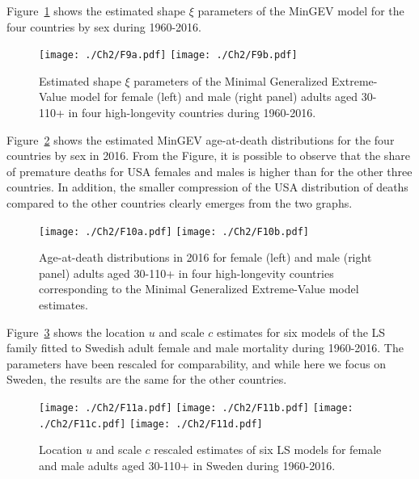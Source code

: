 \documentclass[Thesis]{subfiles}
\begin{document}
Figure~\ref{Fig:ShapeParam} shows the estimated shape $\xi$ parameters of the MinGEV model for the four countries by sex during 1960-2016.
\begin{figure}[!ht]
	\centering
	\texttt{[image: ./Ch2/F9a.pdf]}
	\texttt{[image: ./Ch2/F9b.pdf]}
	
	\caption{Estimated shape $\xi$ parameters of the Minimal Generalized Extreme-Value model for female (left) and male (right panel) adults aged 30-110+ in four high-longevity countries during 1960-2016.}\label{Fig:ShapeParam}
	
	
\end{figure}

Figure~\ref{Fig:Dx2016EV} shows the estimated MinGEV age-at-death distributions for the four countries by sex in 2016. From the Figure, it is possible to observe that the share of premature deaths for USA females and males is higher than for the other three countries. In addition, the smaller compression of the USA distribution of deaths compared to the other countries clearly emerges from the two graphs.

\begin{figure}[!ht]
	\begin{center}
		\texttt{[image: ./Ch2/F10a.pdf]}
		\texttt{[image: ./Ch2/F10b.pdf]} 		
		\caption{Age-at-death distributions in 2016 for female (left) and male (right panel) adults aged 30-110+ in four high-longevity countries corresponding to the Minimal Generalized Extreme-Value model estimates.}\label{Fig:Dx2016EV}
		
	\end{center}  
\end{figure}

Figure~\ref{Fig:Ch2LocSca6models} shows the location $u$ and scale $c$ estimates for six models of the LS family fitted to Swedish adult female and male mortality during 1960-2016. The parameters have been rescaled for comparability, and while here we focus on Sweden, the results are the same for the other countries.

\begin{figure}[!ht]
	\begin{center}
		\texttt{[image: ./Ch2/F11a.pdf]}
		\texttt{[image: ./Ch2/F11b.pdf]} 
		\texttt{[image: ./Ch2/F11c.pdf]}
		\texttt{[image: ./Ch2/F11d.pdf]}
		
		\caption{Location $u$ and scale $c$ rescaled estimates of six LS models for female and male adults aged 30-110+ in Sweden during 1960-2016.\label{Fig:Ch2LocSca6models}} 
		
	\end{center}  
\end{figure}
\end{document}
